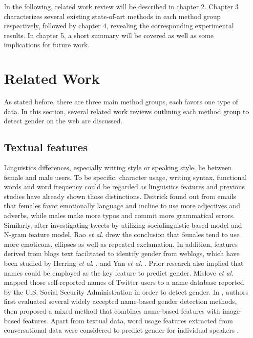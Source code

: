 \documentclass[runningheads]{llncs}
\begin{document}
	In the following, related work review will be described in chapter 2. Chapter 3 characterizes several existing state-of-art methods in each method group respectively, followed by chapter 4, revealing the corresponding experimental results. In chapter 5, a short summary will be covered as well as some implications for future work. 
	
	
	\section{Related Work}
	
	As stated before, there are three main method groups, each favors one type of data. In this section, several related work reviews outlining each method group to detect gender on the web are discussed. 
	
	\subsection{Textual features}
	
	Linguistics differences, especially writing style or speaking style, lie between female and male users. To be specific, character usage, writing syntax, functional words and word frequency could be regarded as linguistics features \cite{deitrick2012author} and previous studies have already shown those distinctions. Deitrick \cite{deitrick2012author} found out from emails that females favor emotionally language and incline to use more adjectives and adverbs, while males make more typos and commit more grammatical errors. Similarly, after investigating tweets by utilizing sociolinguistic-based model and N-gram feature model, Rao \textit{et al}. \cite{rao2010classifying} drew the conclusion that females tend to use more emoticons, ellipses as well as repeated exclamation. In addition, features derived from blogs text facilitated to identify gender from weblogs, which have been studied by Herring \textit{et al}. \cite{herring2004bridging}, and Yan \textit{et al}. \cite{yan2006gender}. Prior research also implied that names could be employed as the key feature to predict gender. Mislove \textit{et al}. \cite{mislove2011understanding} mapped those self-reported names of Twitter users to a name database reported by the U.S. Social Security Administration in order to detect gender.  In \cite{karimi2016inferring}, authors first evaluated several widely accepted name-based gender detection methods, then proposed a mixed method that combines name-based features with image-based features. Apart from textual data, word usage features extracted from conversational data were considered to predict gender for individual speakers \cite{gillick2010can}.  
	
\end{document}
